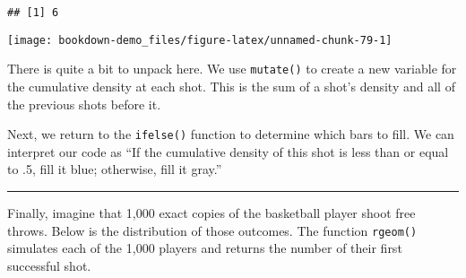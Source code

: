 \documentclass[
]{book}
\newenvironment{Shaded}{\begin{snugshade}}{\end{snugshade}}
\newcommand{\AttributeTok}[1]{\textcolor[rgb]{0.77,0.63,0.00}{#1}}
\newcommand{\DecValTok}[1]{\textcolor[rgb]{0.00,0.00,0.81}{#1}}
\newcommand{\FunctionTok}[1]{\textcolor[rgb]{0.00,0.00,0.00}{#1}}
\newcommand{\NormalTok}[1]{#1}
\newcommand{\OtherTok}[1]{\textcolor[rgb]{0.56,0.35,0.01}{#1}}
\newcommand{\SpecialCharTok}[1]{\textcolor[rgb]{0.00,0.00,0.00}{#1}}
\newcommand{\StringTok}[1]{\textcolor[rgb]{0.31,0.60,0.02}{#1}}
\begin{document}
\begin{verbatim}
## [1] 6
\end{verbatim}

\begin{Shaded}
\end{Shaded}

\begin{center}\texttt{[image: bookdown-demo\_files/figure-latex/unnamed-chunk-79-1]} \end{center}

There is quite a bit to unpack here. We use \texttt{mutate()} to create a new variable for the cumulative density at each shot. This is the sum of a shot's density and all of the previous shots before it.

Next, we return to the \texttt{ifelse()} function to determine which bars to fill. We can interpret our code as ``If the cumulative density of this shot is less than or equal to .5, fill it blue; otherwise, fill it gray.''

\begin{center}\rule{0.5\linewidth}{0.5pt}\end{center}

Finally, imagine that 1,000 exact copies of the basketball player shoot free throws. Below is the distribution of those outcomes. The function \texttt{rgeom()} simulates each of the 1,000 players and returns the number of their first successful shot.
\end{document}
